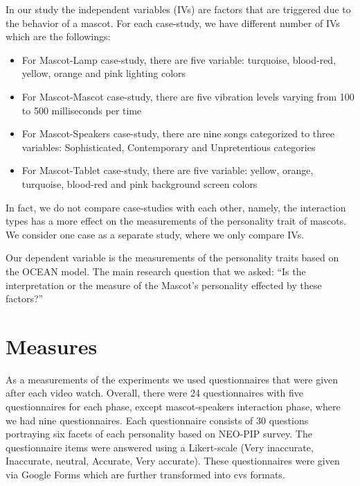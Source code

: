 In our study the independent variables (IVs) are factors that are triggered due to the behavior of a mascot.
For each case-study, we have different number of IVs which are the followings:
\begin{itemize}
  \item For Mascot-Lamp case-study, there are five variable: turquoise, blood-red, yellow, orange and pink lighting colors
  \item For Mascot-Mascot case-study, there are five vibration levels varying from 100 to 500 milliseconds per time
  \item For Mascot-Speakers case-study, there are nine songs categorized to three variables:
        Sophisticated, Contemporary and Unpretentious categories
   \item For Mascot-Tablet case-study, there are five variable: yellow, orange, turquoise,
        blood-red and pink background screen colors
\end{itemize}

In fact, we do not compare case-studies with each other, namely, the interaction types
has a more effect on the measurements of the personality trait of mascots.
We consider one case as a separate study, where we only compare IVs.
\par Our dependent variable is the measurements of the personality traits based on the OCEAN model.
The main research question that we asked: “Is the interpretation or the measure
of the Mascot’s personality effected by these factors?”

\section{Measures}
\label{sec:measures}
As a measurements of the experiments we used questionnaires that were given after each video watch.
Overall, there were 24 questionnaires with five questionnaires for each phase, except
mascot-speakers interaction phase, where we had nine questionnaires.
Each questionnaire consists of 30 questions portraying six facets of each personality based on NEO-PIP survey.
The questionnaire items were answered using a Likert-scale
(Very inaccurate, Inaccurate, neutral, Accurate, Very accurate).
These questionnaires were given via Google Forms which are further transformed into cvs formats.



